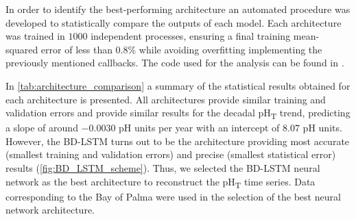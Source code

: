 \begin{table}[H]
    \centering
    \caption[Optimal parameters used for the different RNN
        architectures]{Optimal parameters used for the different RNN
        architectures}
    \label{tab:NNs_parameters}
\end{table}
In order to identify the best-performing architecture an
automated procedure was developed to statistically compare the outputs of each
model. Each architecture was trained in $1000$ independent processes, ensuring
a final training mean-squared error of less than $0.8\%$ while avoiding
overfitting implementing the previously mentioned callbacks. The code used for
the analysis can be found in \cite{CODE}.

In \cref{tab:architecture_comparison} a summary of the statistical results
obtained for each architecture is presented. All architectures provide similar
training and validation errors and provide similar results for the decadal
pH\textsubscript{T} trend, predicting a slope of around $-0.0030$ pH units per
year with an intercept of $8.07$ pH units. However, the BD-LSTM turns out to be
the architecture providing most accurate (smallest training and validation
errors) and precise (smallest statistical error) results
(\cref{fig:BD_LSTM_scheme}). Thus, we selected the BD-LSTM neural network as
the best architecture to reconstruct the pH\textsubscript{T} time series.
Data corresponding to the Bay of Palma were used in the selection of the
best neural network architecture.

